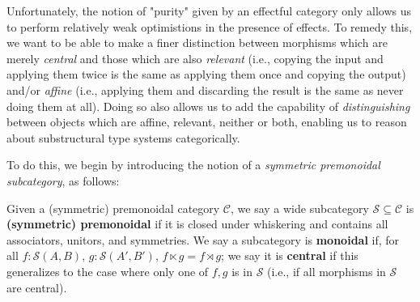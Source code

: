 \documentclass[acmsmall,screen,review]{acmart}
\newcommand{\mc}[1]{\ensuremath{\mathcal{#1}}}
\begin{document}
Unfortunately, the notion of "purity" given by an effectful category only allows
us to perform relatively weak optimistions in the presence of effects. To remedy
this, we want to be able to make a finer distinction between morphisms which are
merely \textit{central} and those which are also \textit{relevant} (i.e.,
copying the input and applying them twice is the same as applying them once and
copying the output) and/or \textit{affine} (i.e., applying them and discarding
the result is the same as never doing them at all). Doing so also allows us to
add the capability of \textit{distinguishing} between objects which are affine,
relevant, neither or both, enabling us to reason about substructural type
systems categorically.

To do this, we begin by introducing the notion of a \textit{symmetric
premonoidal subcategory}, as follows:
\begin{definition}
  Given a (symmetric) premonoidal category \(\mc{C}\), we say a wide subcategory
  \(\mc{S} \subseteq \mc{C}\) is \textbf{(symmetric) premonoidal} if it is
  closed under whiskering and contains all associators, unitors, and symmetries.
  We say a subcategory is \textbf{monoidal} if, for all \(f: \mc{S}(A, B)\),
  \(g: \mc{S}(A', B')\), \(f \ltimes g = f \rtimes g\); we say it is
  \textbf{central} if this generalizes to the case where only one of \(f, g\) is
  in \(\mc{S}\) (i.e., if all morphisms in \(\mc{S}\) are central).
\end{definition} 
\end{document}
